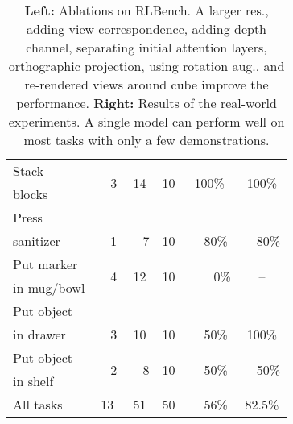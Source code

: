 \begin{table}[!t]
\begin{tabular}{lccccc}
\toprule
Stack           & \multirow{2}{*}{~~3}  & \multirow{2}{*}{14}   & \multirow{2}{*}{10}  & \multirow{2}{*}{100\%}   & \multirow{2}{*}{100\%}   \\
blocks          &                       &                       &                      &                          &                          \\
\rowcolor[HTML]{EFEFEF}
Press           &                       &                       &                      &                          &                          \\
\rowcolor[HTML]{EFEFEF}
sanitizer       & \multirow{-2}{*}{~~1} & \multirow{-2}{*}{~~7} & \multirow{-2}{*}{10} & \multirow{-2}{*}{~~80\%} & \multirow{-2}{*}{~~80\%} \\
Put marker      & \multirow{2}{*}{~~4}  & \multirow{2}{*}{12}   & \multirow{2}{*}{10}  & \multirow{2}{*}{~~~~0\%} & \multirow{2}{*}{--}      \\
in mug/bowl     &                       &                       &                      &                          &                          \\
\rowcolor[HTML]{EFEFEF}
Put object      &                       &                       &                      &                          &                          \\
\rowcolor[HTML]{EFEFEF}
in drawer       & \multirow{-2}{*}{~~3} & \multirow{-2}{*}{10}  & \multirow{-2}{*}{10} & \multirow{-2}{*}{~~50\%} & \multirow{-2}{*}{100\%}  \\
Put object      & \multirow{2}{*}{~~2}  & \multirow{2}{*}{~~8}  & \multirow{2}{*}{10}  & \multirow{2}{*}{~~50\%}  & \multirow{2}{*}{~~50\%}  \\
in shelf        &                       &                       &                      &                          &                          \\
\midrule
All tasks       & 13                    & 51                    & 50                   & ~~56\%                   & 82.5\%                   \\
\bottomrule
 \end{tabular}
 \vspace{1mm}
 \caption{\textbf{Left:} Ablations on RLBench. A larger res., adding view correspondence, adding depth channel, separating initial attention layers, orthographic projection, using rotation aug., and re-rendered views around cube improve the performance. \textbf{Right:} Results of the real-world experiments. A single \method model can perform well on most tasks with only a few demonstrations.}
 \label{table:rlbench_ablation}
 \vspace{-7mm}
\end{table}


